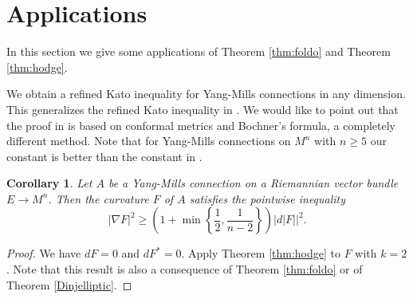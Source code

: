 \documentclass[12pt]{amsart} %
\newtheorem{corollary}[theorem]{Corollary}
\theoremstyle{definition}
\numberwithin{equation}{section}
\newcommand{\ra}{\rightarrow}
\begin{document}
\section{Applications} \label{sect5}

In this section we give some applications of Theorem \ref{thm:foldo} and Theorem \ref{thm:hodge}.


We obtain a refined Kato inequality for Yang-Mills connections in
any dimension. This generalizes the refined Kato inequality in \cite{R1991, GKS2018}. We would like to point out that the proof in \cite{GKS2018}
is based on conformal metrics and Bochner's formula, a completely different method. Note that for Yang-Mills connections on $M^{n}$
with $n\geq5$ our constant is better than the constant in \cite{SU2019}.
\begin{corollary}
Let $A$ be a Yang-Mills connection on a Riemannian vector bundle $E \ra M^n$. Then the curvature $F$ of $A$ satisfies the pointwise inequality
\[
\left|\nabla F\right|^{2}\geq\left(1+\min\left\{ \frac{1}{2},\frac{1}{n-2}\right\} \right)\left|d\left|F\right|\right|^{2}.
\]
\end{corollary}
\begin{proof}
We have $dF=0$ and $dF^{*}=0$. Apply Theorem \ref{thm:hodge} to
$F$ with $k=2$. Note that this result is also a consequence of Theorem \ref{thm:foldo} or of Theorem \ref{Dinjelliptic}.
\end{proof}
\end{document}
